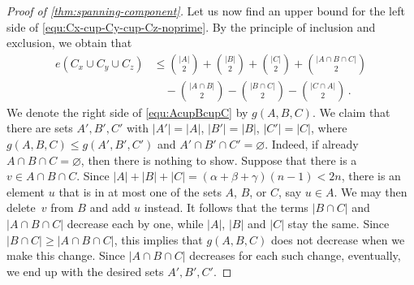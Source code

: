 \documentclass[12pt,reqno]{amsart}
\let\emptyset=\varnothing
\theoremstyle{plain}
\theoremstyle{definition}
\numberwithin{equation}{section}
\newcommand{\al}{\alpha}
\newcommand{\be}{\beta}
\newcommand{\ce}{\gamma}
\newcommand{\abs}[1]{\left\lvert#1\right\rvert}
\begin{document}
\begin{proof}[Proof of \cref{thm:spanning-component}]
		Let us now find an upper bound for the left side of \eqref{equ:Cx-cup-Cy-cup-Cz-noprime}.
		By the principle of inclusion and exclusion, we obtain that
		\begin{align}
			e(C_x \cup C_y \cup C_z) &\leq \binom{|A|}{2} + \binom{|B|}{2} + \binom{|C|}{2} +  \binom{|A \cap B \cap C|}{2}  \nonumber \\ 
			&\quad - \binom{|A \cap B|}{2} - \binom{|B \cap C|}{2} - \binom{|C \cap A|}{2} \,. \label{equ:AcupBcupC}
		\end{align}
		We denote the right side of \eqref{equ:AcupBcupC} by $g(A,B,C)$. We claim that there are sets $A',B',C'$ with $\abs{A'}=\abs{A}$, $\abs{B'}=\abs{B}$, $\abs{C'}=\abs{C}$, where $g(A,B,C)\le g(A',B',C')$ and $A'\cap B'\cap C'=\emptyset$. Indeed, if already $A\cap B\cap C=\emptyset$, then there is nothing to show. Suppose that there is a $v \in A \cap B \cap C$.
		Since $\abs{A} + \abs{B} + \abs{C} =(\al+\be+\ce)(n-1)< 2n$, there is an element $u$ that is in at most one of the sets $A$, $B$, or $C$, say $u \in A$.
		We may then delete~$v$ from $B$ and add $u$ instead.
		It follows that the terms $|B \cap C|$ and $|A \cap B \cap C|$ decrease each by one, while $|A|$, $|B|$ and $|C|$ stay the same.
		Since $|B \cap C| \geq |A \cap B \cap C|$, this implies that $g(A,B,C)$ does not decrease when we make this change. Since $\abs{A\cap B\cap C}$ decreases for each such change, eventually, we end up with the desired sets $A',B',C'$.
		

\end{proof}
\end{document}
